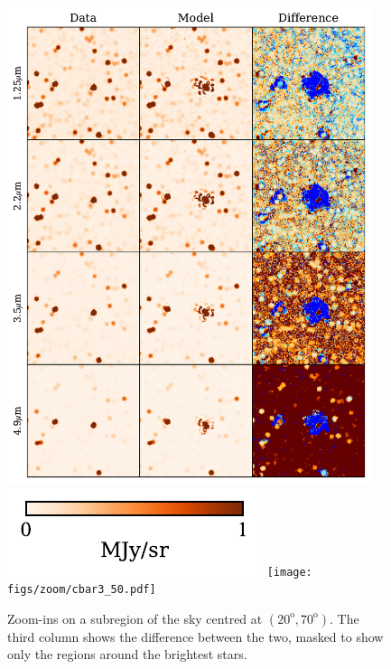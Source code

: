 \documentclass{aa}
\begin{document}
\begin{figure}
  \includegraphics[width=0.95\textwidth]{figs/zoom/combined_zoom.pdf}\\
  \vspace{-8pt}
  \hspace{1.5in}
  \includegraphics[scale=1]{figs/zoom/cbar1.pdf}
  \hspace{1.1in}
  \texttt{[image: figs/zoom/cbar3\_50.pdf]}
  \caption{Zoom-ins on a subregion of the sky centred at $(20^\mathrm{o},70^\mathrm{o})$. The third column shows the difference between the two, masked to show only the regions around the brightest stars.}
  \label{fig:zooms}
\end{figure}
\end{document}
